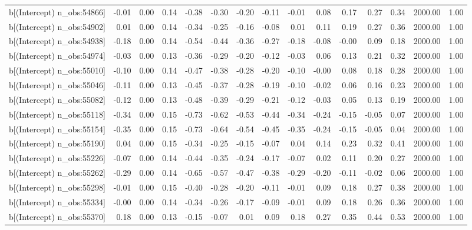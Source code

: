 \begin{table}[ht]
\begin{tabular}{rrrrrrrrrrrrrrr}
  b[(Intercept) n\_obs:54866] & -0.01 & 0.00 & 0.14 & -0.38 & -0.30 & -0.20 & -0.11 & -0.01 & 0.08 & 0.17 & 0.27 & 0.34 & 2000.00 & 1.00 \\ 
  b[(Intercept) n\_obs:54902] & 0.01 & 0.00 & 0.14 & -0.34 & -0.25 & -0.16 & -0.08 & 0.01 & 0.11 & 0.19 & 0.27 & 0.36 & 2000.00 & 1.00 \\ 
  b[(Intercept) n\_obs:54938] & -0.18 & 0.00 & 0.14 & -0.54 & -0.44 & -0.36 & -0.27 & -0.18 & -0.08 & -0.00 & 0.09 & 0.18 & 2000.00 & 1.00 \\ 
  b[(Intercept) n\_obs:54974] & -0.03 & 0.00 & 0.13 & -0.36 & -0.29 & -0.20 & -0.12 & -0.03 & 0.06 & 0.13 & 0.21 & 0.32 & 2000.00 & 1.00 \\ 
  b[(Intercept) n\_obs:55010] & -0.10 & 0.00 & 0.14 & -0.47 & -0.38 & -0.28 & -0.20 & -0.10 & -0.00 & 0.08 & 0.18 & 0.28 & 2000.00 & 1.00 \\ 
  b[(Intercept) n\_obs:55046] & -0.11 & 0.00 & 0.13 & -0.45 & -0.37 & -0.28 & -0.19 & -0.10 & -0.02 & 0.06 & 0.16 & 0.23 & 2000.00 & 1.00 \\ 
  b[(Intercept) n\_obs:55082] & -0.12 & 0.00 & 0.13 & -0.48 & -0.39 & -0.29 & -0.21 & -0.12 & -0.03 & 0.05 & 0.13 & 0.19 & 2000.00 & 1.00 \\ 
  b[(Intercept) n\_obs:55118] & -0.34 & 0.00 & 0.15 & -0.73 & -0.62 & -0.53 & -0.44 & -0.34 & -0.24 & -0.15 & -0.05 & 0.07 & 2000.00 & 1.00 \\ 
  b[(Intercept) n\_obs:55154] & -0.35 & 0.00 & 0.15 & -0.73 & -0.64 & -0.54 & -0.45 & -0.35 & -0.24 & -0.15 & -0.05 & 0.04 & 2000.00 & 1.00 \\ 
  b[(Intercept) n\_obs:55190] & 0.04 & 0.00 & 0.15 & -0.34 & -0.25 & -0.15 & -0.07 & 0.04 & 0.14 & 0.23 & 0.32 & 0.41 & 2000.00 & 1.00 \\ 
  b[(Intercept) n\_obs:55226] & -0.07 & 0.00 & 0.14 & -0.44 & -0.35 & -0.24 & -0.17 & -0.07 & 0.02 & 0.11 & 0.20 & 0.27 & 2000.00 & 1.00 \\ 
  b[(Intercept) n\_obs:55262] & -0.29 & 0.00 & 0.14 & -0.65 & -0.57 & -0.47 & -0.38 & -0.29 & -0.20 & -0.11 & -0.02 & 0.06 & 2000.00 & 1.00 \\ 
  b[(Intercept) n\_obs:55298] & -0.01 & 0.00 & 0.15 & -0.40 & -0.28 & -0.20 & -0.11 & -0.01 & 0.09 & 0.18 & 0.27 & 0.38 & 2000.00 & 1.00 \\ 
  b[(Intercept) n\_obs:55334] & -0.00 & 0.00 & 0.14 & -0.34 & -0.26 & -0.17 & -0.09 & -0.01 & 0.09 & 0.18 & 0.26 & 0.36 & 2000.00 & 1.00 \\ 
  b[(Intercept) n\_obs:55370] & 0.18 & 0.00 & 0.13 & -0.15 & -0.07 & 0.01 & 0.09 & 0.18 & 0.27 & 0.35 & 0.44 & 0.53 & 2000.00 & 1.00 \\ 

\end{tabular}
\end{table}
